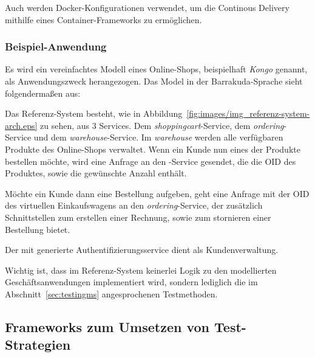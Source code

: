 \documentclass[12pt,a4paper,bibliography=totocnumbered,listof=totocnumbered]{scrartcl}
\begin{document}
Auch werden Docker-Konfigurationen verwendet, um die Continous Delivery mithilfe eines Container-Frameworks zu ermöglichen.

\subsubsection{Beispiel-Anwendung}

Es wird ein vereinfachtes Modell eines Online-Shops, beispielhaft \textit{Kongo} genannt, als Anwendungszweck herangezogen. Das Model in der Barrakuda-Sprache sieht folgendermaßen aus:



Das Referenz-System besteht, wie in Abbildung~\ref{fig:images/img_referenz-system-arch.eps} zu sehen, aus 3 Services. Dem \textit{shoppingcart}-Service, dem \textit{ordering}-Service und dem \textit{warehouse}-Service. Im \textit{warehouse} werden alle verfügbaren Produkte des Online-Shops verwaltet. Wenn ein Kunde nun eines der Produkte bestellen möchte, wird eine Anfrage an den -Service gesendet, die die OID des Produktes, sowie die gewünschte Anzahl enthält.

Möchte ein Kunde dann eine Bestellung aufgeben, geht eine Anfrage mit der OID des virtuellen Einkaufswagens an den \textit{ordering}-Service, der zusätzlich Schnittstellen zum erstellen einer Rechnung, sowie zum stornieren einer Bestellung bietet.

Der mit generierte Authentifizierungsservice dient als Kundenverwaltung.


Wichtig ist, dass im Referenz-System keinerlei Logik zu den modellierten Geschäftsanwendungen implementiert wird, sondern lediglich die im Abschnitt~\ref{sec:testingms} angesprochenen Testmethoden.

\subsection{Frameworks zum Umsetzen von Test-Strategien}\label{ch:ms-test-frw}
\end{document}
